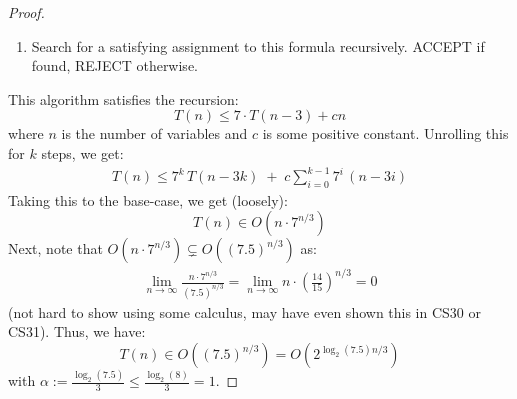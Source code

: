 \documentclass[12pt]{article}
\begin{document}
\begin{proof}
\begin{enumerate}
        \item Search for a satisfying assignment to this formula recursively. ACCEPT if found, REJECT otherwise. 
    \end{enumerate}
    This algorithm satisfies the recursion: 
    \[ T(n) \leq 7\cdot T(n-3) + c n\]
    where $n$ is the number of variables and $c$ is some positive constant. Unrolling this for $k$ steps, we get: 
    \begin{align*}
        T(n) \le 7^k\,T(n - 3k) \;+\; c \sum_{i=0}^{k-1} 7^i \,(n - 3i)
    \end{align*}
    Taking this to the base-case, we get (loosely): 
    \[ T(n) \in O(n \cdot 7^{n/3} )\]
    Next, note that $O(n \cdot 7^{n/3}) \subsetneq O((7.5)^{n/3})$ as: 
    \begin{align*}
        \lim_{n\to\infty}\frac{n \cdot 7^{n/3} }{(7.5)^{n/3}} = \lim_{n\to\infty} n \cdot \left(\frac{14}{15}\right)^{n/3} = 0
    \end{align*}
    (not hard to show using some calculus, may have even shown this in CS30 or CS31). \bbni
    Thus, we have: 
    \[ T(n) \in O((7.5)^{n/3}) = O(2^{\log_2(7.5)n/3})\]
    with $\alpha := \frac{\log_2(7.5)}{3} \leq \frac{\log_2(8)}{3} = 1$.
\end{proof}
\end{document}
